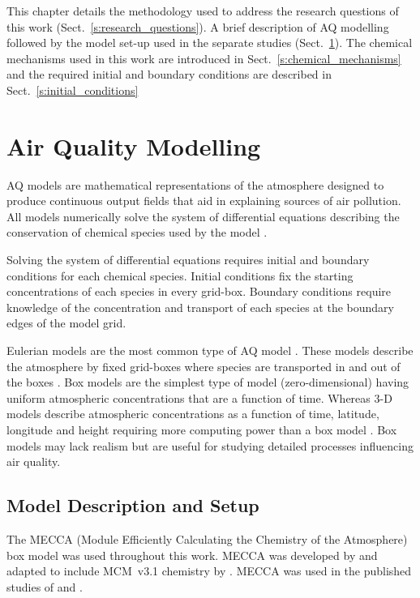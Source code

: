 This chapter details the methodology used to address the research questions of this work (Sect.~\ref{s:research_questions}).
A brief description of AQ modelling followed by the model set-up used in the separate studies (Sect.~\ref{s:modelling}). 
The chemical mechanisms used in this work are introduced in Sect.~\ref{s:chemical_mechanisms} and the required initial and boundary conditions are described in Sect.~\ref{s:initial_conditions} 

\section{Air Quality Modelling} \label{s:modelling}
AQ models are mathematical representations of the atmosphere designed to produce continuous output fields that aid in explaining sources of air pollution.
All models numerically solve the system of differential equations describing the conservation of chemical species used by the model \citep{Russell:2000}.

Solving the system of differential equations requires initial and boundary conditions for each chemical species.
Initial conditions fix the starting concentrations of each species in every grid-box.
Boundary conditions require knowledge of the concentration and transport of each species at the boundary edges of the model grid.

Eulerian models are the most common type of AQ model \citep{Russell:2000}.
These models describe the atmosphere by fixed grid-boxes where species are transported in and out of the boxes \citep{Seinfeld:2006}. 
Box models are the simplest type of model (zero-dimensional) having uniform atmospheric concentrations that are a function of time.
Whereas 3-D models describe atmospheric concentrations as a function of time, latitude, longitude and height requiring more computing power than a box model \citep{Seinfeld:2006}.
Box models may lack realism but are useful for studying detailed processes influencing air quality.

\subsection{Model Description and Setup} \label{ss:model_setup}
The MECCA (Module Efficiently Calculating the Chemistry of the Atmosphere) box model was used throughout this work.
MECCA was developed by \citet{Sander:2005} and adapted to include MCM~v3.1 chemistry by \citet{Butler:2011}.
MECCA was used in the published studies of \citet{Kubistin:2010} and \citet{Lourens:2016}.

